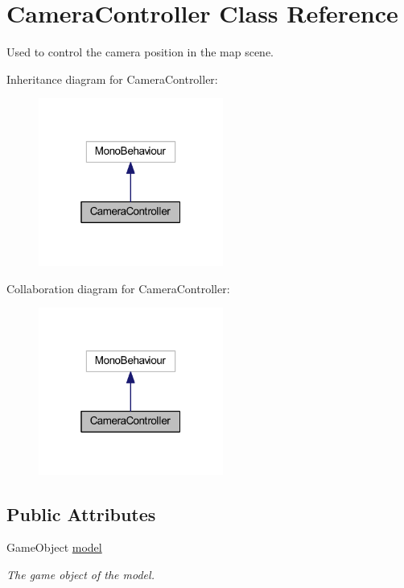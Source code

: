\hypertarget{class_camera_controller}{}\section{Camera\+Controller Class Reference}
\label{class_camera_controller}


Used to control the camera position in the map scene.  




Inheritance diagram for Camera\+Controller\+:\nopagebreak
\begin{figure}[H]
\begin{center}
\leavevmode
\includegraphics[width=172pt]{class_camera_controller__inherit__graph}
\end{center}
\end{figure}


Collaboration diagram for Camera\+Controller\+:\nopagebreak
\begin{figure}[H]
\begin{center}
\leavevmode
\includegraphics[width=172pt]{class_camera_controller__coll__graph}
\end{center}
\end{figure}
\subsection*{Public Attributes}
\begin{DoxyCompactItemize}
\item 
Game\+Object \mbox{\hyperlink{class_camera_controller_ae690a4bedc4d8c38e4f26b446fb072da}{model}}
\begin{DoxyCompactList}\small\item\em The game object of the model. \end{DoxyCompactList}\end{DoxyCompactItemize}
